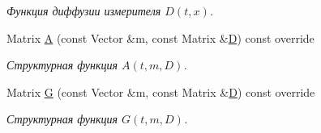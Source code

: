 \begin{DoxyCompactItemize}
\begin{DoxyCompactList}\small\item\em Функция диффузии измерителя $D(t,x)$. \end{DoxyCompactList}\item 
Matrix \hyperlink{class_tasks_1_1_continuous_1_1_landing_linear_a8b06d0f38d73a27f7de0df6ba36b9c38}{A} (const Vector \&m, const Matrix \&\hyperlink{class_tasks_1_1_continuous_1_1_landing_linear_a829c4b67c6a4cd8bb1a430e4e55d9d45}{D}) const override
\begin{DoxyCompactList}\small\item\em Структурная функция $A(t, m, D)$. \end{DoxyCompactList}\item 
Matrix \hyperlink{class_tasks_1_1_continuous_1_1_landing_linear_af5937be9d9010e853956e5dd7ff96e8d}{G} (const Vector \&m, const Matrix \&\hyperlink{class_tasks_1_1_continuous_1_1_landing_linear_a829c4b67c6a4cd8bb1a430e4e55d9d45}{D}) const override
\begin{DoxyCompactList}\small\item\em Структурная функция $G(t, m, D)$. \end{DoxyCompactList}\end{DoxyCompactItemize}
